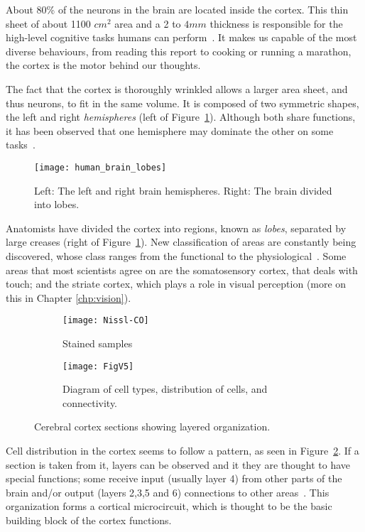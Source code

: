 About 80\% of the neurons in the brain are located inside the cortex. This thin sheet of about 1100 $cm^2$ area and a 2 to $4 mm$ thickness is responsible for the high-level cognitive tasks humans can perform~\cite{thompson2000brain}. It makes us capable of the most diverse behaviours, from reading this report to cooking or running a marathon, the cortex is the motor behind our thoughts. 

The fact that the cortex is thoroughly wrinkled allows a larger area sheet, and thus neurons, to fit in the same volume. It is composed of two symmetric shapes, the left and right \emph{hemispheres} (left of Figure~\ref{fig:brain:hemi-lobes}). Although both share functions, it has been observed that one hemisphere may dominate the other on some tasks~\cite{lateralization}. 

\begin{figure}[hbt]
  \begin{center}
    \texttt{[image: human\_brain\_lobes]}
    \caption{Left: The left and right brain hemispheres. Right: The brain divided into lobes.}
    \label{fig:brain:hemi-lobes}
  \end{center}
\end{figure}

Anatomists have divided the cortex into regions, known as \emph{lobes},  separated by large creases (right of Figure~\ref{fig:brain:hemi-lobes}). New classification of areas are constantly being discovered, whose class ranges from the functional to the physiological~\cite{eye-brain-vision-hubel1995}. Some areas that most scientists agree on are the somatosensory cortex, that deals with touch; and the striate cortex, which plays a role in visual perception (more on this in Chapter \ref{chp:vision}).

\begin{figure}[ht]
  \begin{center}
    \begin{subfigure}{0.4\textwidth}
      \texttt{[image: Nissl-CO]}
      \caption{Stained samples}
    \end{subfigure}
    \begin{subfigure}{0.4\textwidth}
      \texttt{[image: FigV5]}
      \caption{Diagram of cell types, distribution of cells, and connectivity.}
    \end{subfigure}
    \caption{Cerebral cortex sections showing layered organization.}
    \label{fig:neuro:cortex-layers}
  \end{center}
\end{figure}

Cell distribution in the cortex seems to follow a pattern, as seen in Figure~\ref{fig:neuro:cortex-layers}. If a section is taken from it,  layers can be observed and it they are thought to have special functions; some  receive input (usually layer 4) from other parts of the brain and/or output (layers 2,3,5 and 6) connections to other areas~\cite{thompson2000brain,eye-brain-vision-hubel1995}. This organization forms a cortical microcircuit, which is thought to be the basic building block of the cortex functions.
